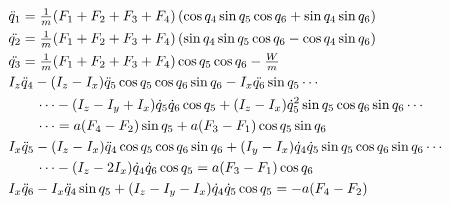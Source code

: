 \documentclass[twocolumn,10pt]{asme2e}
\begin{document}
{\begin{align}
&\ddot{q}_{1}=\tfrac{1}{m}(F_{1}+F_{2}+F_{3}+F_{4})\left(\cos q_4 \sin q_5 \cos q_6+\sin q_4\sin q_6\right)\label{eom1}\\
&\ddot{q_{2}}=\tfrac{1}{m}(F_{1}+F_{2}+F_{3}+F_{4})\left(\sin q_4 \sin q_5 \cos q_6-\cos q_4\sin q_6\right)\\
&\ddot{q_{3}}=\tfrac{1}{m}(F_{1}+F_{2}+F_{3}+F_{4})\cos q_{5}\cos q_{6}-\tfrac{W}{m}\\
& I_{z}\ddot{q}_{4}-(I_z-I_{x})\ddot{q}_{5}\cos{q}_{5}\cos{q}_{6}\sin{q}_{6}-I_{x}\ddot{q_{6}}\sin{q}_{5}\cdots\notag\\
&\qquad\cdots-(I_z-I_y+I_x)\dot{q}_5\dot{q}_6\cos{q}_5+(I_z-I_x)\dot{q}_5^2\sin{q}_5\cos{q}_6\sin{q}_6\cdots\notag\\
&\qquad\cdots=	a(F_{4}-F_{2})\sin q_5+ a(F_3-F_1)\cos q_5\sin q_6\\
&I_x\ddot{q}_5-(I_z-I_{x})\ddot{q}_{4}\cos{q}_{5}\cos{q}_{6}\sin{q}_{6}+(I_y-I_{x})\dot{q}_{4}\dot{q}_{5}\sin{q}_{5}\cos{q}_{6}\sin{q}_{6}\cdots\notag\\
&\qquad\cdots-(I_z-2I_{x})\dot{q}_{4}\dot{q}_{6}\cos{q}_{5}=a(F_3-F_1)\cos q_6\\
&I_x\ddot{q}_6-I_{x}\ddot{q}_4\sin q_5+(I_z-I_y-I_x)\dot{q}_4\dot{q}_5\cos{q}_5=-a(F_{4}-F_2)\label{eom6}
\end{align}

}
\end{document}
